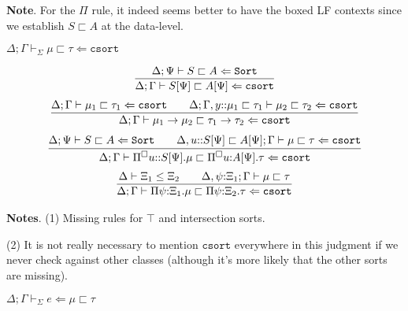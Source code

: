 \documentclass[letterpaper, 11pt]{article}
\newcommand{\Lar}{\Leftarrow}
\newcommand{\rar}{\rightarrow}
\newcommand{\Sort}{\texttt{Sort}}
\newcommand{\csort}{\texttt{csort}}
\begin{document}
    \textbf{Note}.  For the $\Pi$ rule, it indeed seems better to have the boxed LF contexts since we establish $S \sqsubset A$ at the data-level.

    $\boxed{ \Delta; \Gamma \vdash_\Sigma \mu \sqsubset \tau \Lar \csort}$

    \begin{align*}
      \infer{ \Delta; \Gamma \vdash S[\Psi] \sqsubset A[\Psi] \Lar \csort}
            { \Delta; \Psi \vdash S \sqsubset A \Lar \Sort}
    \end{align*}
    \begin{align*}
      \infer{ \Delta; \Gamma \vdash \mu_1 \rar \mu_2 \sqsubset \tau_1 \rar \tau_2 \Lar \csort}
            {
               \Delta; \Gamma \vdash \mu_1 \sqsubset \tau_1 \Lar \csort
              &&
               \Delta; \Gamma, y{::}\mu_1 \sqsubset \tau_1 \vdash \mu_2 \sqsubset \tau_2 \Lar \csort
            }
    \end{align*}
    \begin{align*}
      \infer{ \Delta; \Gamma \vdash \Pi^\square u{::} S[\Psi]. \mu \sqsubset \Pi^\square u{:}A[\Psi]. \tau \Lar \csort}
            {
               \Delta; \Psi \vdash S \sqsubset A \Lar \Sort
              &&
               \Delta, u{::}S[\Psi] \sqsubset A[\Psi]; \Gamma \vdash \mu \sqsubset \tau \Lar \csort
            }
    \end{align*}
    \begin{align*}
      \infer{ \Delta; \Gamma \vdash\Pi \psi{:}\Xi_1 . \mu \sqsubset \Pi \psi{:}\Xi_2 . \tau \Lar \csort}
            {
               \Delta \vdash \Xi_1 \leq \Xi_2
              &&
              \Delta, \psi{:}\Xi_1; \Gamma \vdash \mu \sqsubset \tau
            }
    \end{align*}

    \textbf{Notes}. (1) Missing rules for $\top$ and intersection sorts.

    (2) It is not really necessary to mention $\csort$ everywhere in this judgment if we never check against other classes (although it's
    more likely that the other sorts are missing).

    $\boxed{ \Delta; \Gamma \vdash_\Sigma e \Lar \mu \sqsubset \tau}$
\end{document}

